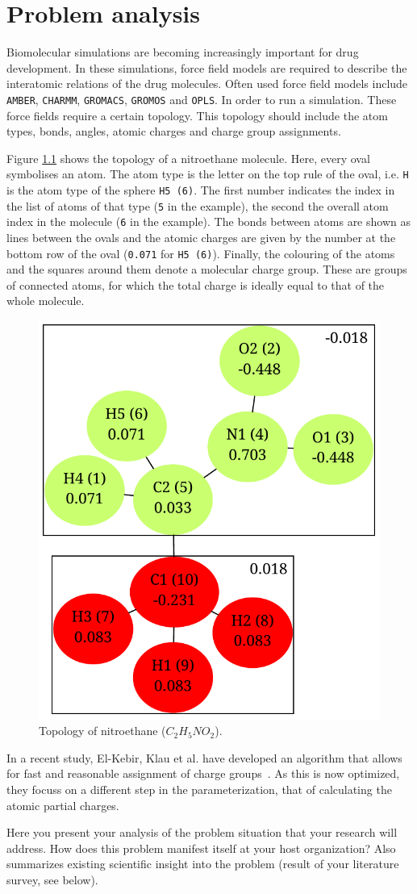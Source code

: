 \chapter{Problem analysis}

Biomolecular simulations are becoming increasingly important for drug development. In these simulations, force field models are required to describe the interatomic relations of the drug molecules. Often used force field models include \verb|AMBER|, \verb|CHARMM|, \verb|GROMACS|, \verb|GROMOS| and \verb|OPLS|. In order to run a simulation. These force fields require a certain topology. This topology should include the atom types, bonds, angles, atomic charges and charge group assignments.

Figure \ref{fig:partial_charges} shows the topology of a nitroethane molecule. Here, every oval symbolises an atom. The atom type is the letter on the top rule of the oval, i.e. \verb|H| is the atom type of the sphere \verb|H5 (6)|. The first number indicates the index in the list of atoms of that type (\verb|5| in the example), the second the overall atom index in the molecule (\verb|6| in the example). The bonds between atoms are shown as lines between the ovals and the atomic charges are given by the number at the bottom row of the oval (\verb|0.071| for \verb|H5 (6)|). Finally, the colouring of the atoms and the squares around them denote a molecular charge group. These are groups of connected atoms, for which the total charge is ideally equal to that of the whole molecule.

\begin{figure}[h!]
\begin{center}
\includegraphics[width=.4\textwidth]{img/partial_charges.pdf}
\caption{Topology of nitroethane ($C_{2}H_{5}NO_{2}$).}
\label{fig:partial_charges}
\end{center}
\end{figure}

In a recent study, El-Kebir, Klau et al. have developed an algorithm that allows for fast and reasonable assignment of charge groups~\cite{canzar2012charge}. As this is now optimized, they focuss on a different step in the parameterization, that of calculating the atomic partial charges. %


Here you present your analysis of the problem situation that your research will address. How does this problem manifest itself at your host organization? Also summarizes existing scientific insight into the problem (result of your literature survey, see below).

\lipsum[5]


